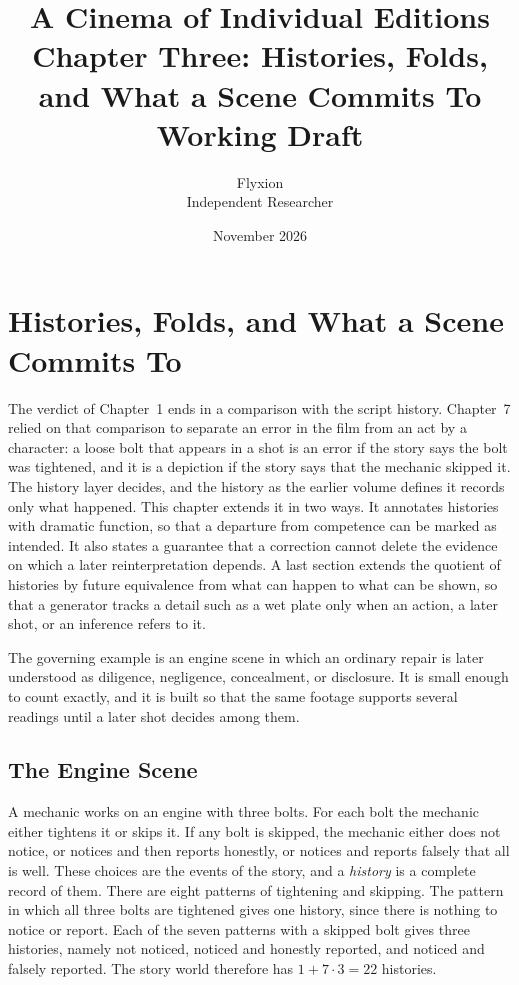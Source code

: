 \documentclass[11pt,twoside,openright]{book}
\title{\Huge\bfseries A Cinema of Individual Editions\\[1.2ex]
\large Chapter Three: Histories, Folds, and What a Scene Commits To\\[0.4ex]
\large Working Draft}
\author{Flyxion\\[0.3ex]\small Independent Researcher}
\date{November 2026}
\theoremstyle{plain}
\theoremstyle{definition}
\theoremstyle{remark}
\begin{document}
\frontmatter
\maketitle
\tableofcontents
\mainmatter
\setcounter{chapter}{2}

\chapter{Histories, Folds, and What a Scene Commits To}
\label{ch:histories}

The verdict of Chapter~1 ends in a comparison with the script history. Chapter~7 relied on that comparison to separate an error in the film from an act by a character: a loose bolt that appears in a shot is an error if the story says the bolt was tightened, and it is a depiction if the story says that the mechanic skipped it. The history layer decides, and the history as the earlier volume defines it records only what happened. This chapter extends it in two ways. It annotates histories with dramatic function, so that a departure from competence can be marked as intended. It also states a guarantee that a correction cannot delete the evidence on which a later reinterpretation depends. A last section extends the quotient of histories by future equivalence from what can happen to what can be shown, so that a generator tracks a detail such as a wet plate only when an action, a later shot, or an inference refers to it.

The governing example is an engine scene in which an ordinary repair is later understood as diligence, negligence, concealment, or disclosure. It is small enough to count exactly, and it is built so that the same footage supports several readings until a later shot decides among them.

\section{The Engine Scene}\label{sec:engine}

A mechanic works on an engine with three bolts. For each bolt the mechanic either tightens it or skips it. If any bolt is skipped, the mechanic either does not notice, or notices and then reports honestly, or notices and reports falsely that all is well. These choices are the events of the story, and a \emph{history} is a complete record of them. There are eight patterns of tightening and skipping. The pattern in which all three bolts are tightened gives one history, since there is nothing to notice or report. Each of the seven patterns with a skipped bolt gives three histories, namely not noticed, noticed and honestly reported, and noticed and falsely reported. The story world therefore has $1+7\cdot3=22$ histories.
\end{document}
